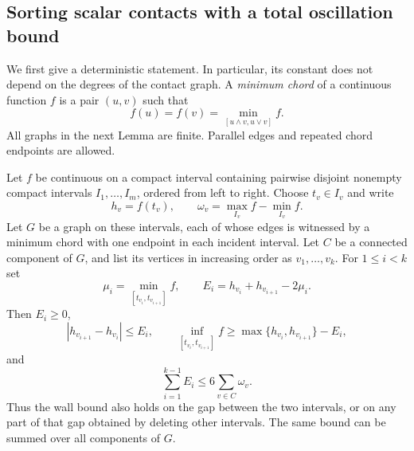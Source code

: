 \subsection{Sorting scalar contacts with a total oscillation bound}

We first give a deterministic statement.  In particular, its constant does
not depend on the degrees of the contact graph.  A \emph{minimum chord} of
a continuous function $f$ is a pair $(u,v)$ such that
\[
 f(u)=f(v)=\min_{[u\wedge v,u\vee v]}f.
\]
All graphs in the next Lemma are finite.  Parallel edges and repeated chord
endpoints are allowed.

\begin{lemma}\label{arm:sorted-scalar-contacts}
Let $f$ be continuous on a compact interval containing pairwise disjoint
nonempty compact intervals $I_1,\ldots,I_m$, ordered from left to right.
Choose $t_v\in I_v$ and write
\[
 h_v=f(t_v),\qquad \omega_v=\max_{I_v}f-\min_{I_v}f.
\]
Let $G$ be a graph on these intervals, each of whose edges is witnessed by
a minimum chord with one endpoint in each incident interval.  Let $C$ be
a connected component of $G$, and list its vertices in increasing order
as $v_1,\ldots,v_k$.  For $1\le i<k$ set
\begin{equation}\label{arm:sorted-contact-errors}
 \mu_i=\min_{[t_{v_i},t_{v_{i+1}}]} f,
 \qquad E_i=h_{v_i}+h_{v_{i+1}}-2\mu_i.
\end{equation}
Then $E_i\ge0$,
\begin{equation}\label{arm:sorted-contact-walls}
 |h_{v_{i+1}}-h_{v_i}|\le E_i,
 \qquad
 \inf_{[t_{v_i},t_{v_{i+1}}]}f
 \ge \max\{h_{v_i},h_{v_{i+1}}\}-E_i,
\end{equation}
and
\begin{equation}\label{arm:sorted-contact-total}
 \sum_{i=1}^{k-1}E_i\le 6\sum_{v\in C}\omega_v.
\end{equation}
Thus the wall bound also holds on the gap between the two intervals, or
on any part of that gap obtained by deleting other intervals.  The same
bound can be summed over all components of $G$.
\end{lemma}


